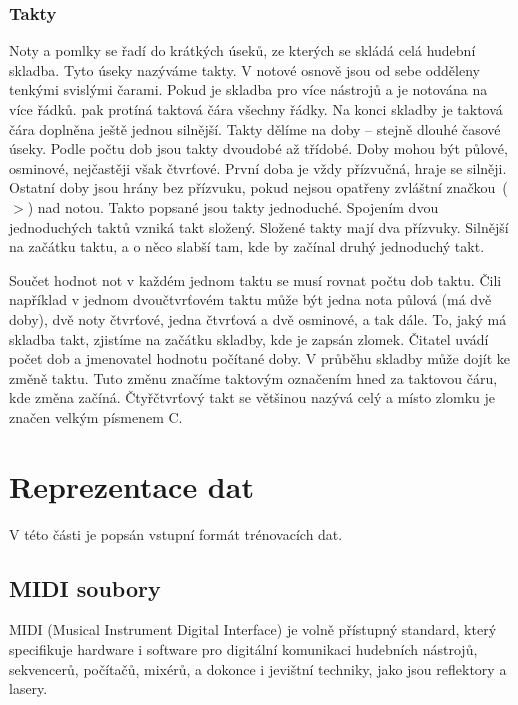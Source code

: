 \subsection*{Takty}
Noty a pomlky se řadí do krátkých úseků, ze kterých se skládá celá hudební skladba.
Tyto úseky nazýváme takty.
V notové osnově jsou od sebe odděleny tenkými svislými čarami.
Pokud je skladba pro více nástrojů a je notována na více řádků. pak protíná taktová čára všechny řádky.
Na konci skladby je taktová čára doplněna ještě jednou silnější. 
Takty dělíme na doby -- stejně dlouhé časové úseky.
Podle počtu dob jsou takty dvoudobé až třídobé.
Doby mohou být půlové, osminové, nejčastěji však čtvrťové.
První doba je vždy přízvučná, hraje se silněji.
Ostatní doby jsou hrány bez přízvuku, pokud nejsou opatřeny zvláštní značkou~($>$) nad notou.
Takto popsané jsou takty jednoduché.
Spojením dvou jednoduchých taktů vzniká takt složený.
Složené takty mají dva přízvuky.
Silnější na začátku taktu, a o něco slabší tam, kde by začínal druhý jednoduchý takt.
\par

Součet hodnot not v každém jednom taktu se musí rovnat počtu dob taktu.
Čili například v jednom  dvoučtvrťovém taktu může být jedna nota půlová (má dvě doby), dvě noty čtvrťové, jedna čtvrťová a dvě osminové, a tak dále.
To, jaký má skladba takt, zjistíme na začátku skladby, kde je zapsán zlomek.
Čitatel uvádí počet dob a jmenovatel hodnotu počítané doby.
V průběhu skladby může dojít ke změně taktu.
Tuto změnu značíme taktovým označením hned za taktovou čáru, kde změna začíná.
Čtyřčtvrťový takt se většinou nazývá celý a místo zlomku je značen velkým písmenem C.
\cite{cmiral,zenkl}


\chapter{Reprezentace dat}
V této části je popsán vstupní formát trénovacích dat.

\section{MIDI soubory}
MIDI (Musical Instrument Digital Interface) je volně přístupný standard,
který specifikuje hardware i software pro digitální komunikaci hudebních nástrojů,
sekvencerů, počítačů, mixérů, a dokonce i jevištní techniky, jako jsou reflektory a lasery.
\cite{MIDI_tutorials}
\par


